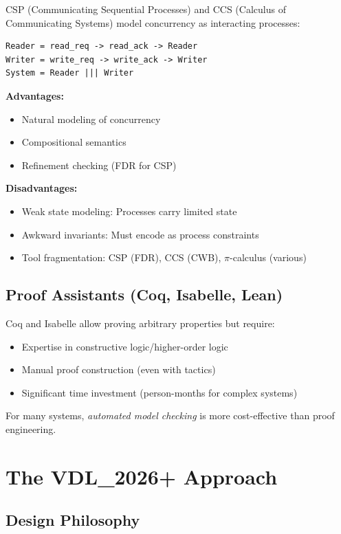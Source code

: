 \documentclass[conference]{IEEEtran}
\begin{document}
CSP (Communicating Sequential Processes) \cite{hoare1985} and CCS (Calculus of Communicating Systems) \cite{milner1989} model concurrency as interacting processes:

\begin{verbatim}
Reader = read_req -> read_ack -> Reader
Writer = write_req -> write_ack -> Writer
System = Reader ||| Writer
\end{verbatim}

\textbf{Advantages:}
\begin{itemize}
\item Natural modeling of concurrency
\item Compositional semantics
\item Refinement checking (FDR for CSP)
\end{itemize}

\textbf{Disadvantages:}
\begin{itemize}
\item Weak state modeling: Processes carry limited state
\item Awkward invariants: Must encode as process constraints
\item Tool fragmentation: CSP (FDR), CCS (CWB), $\pi$-calculus (various)
\end{itemize}

\subsection{Proof Assistants (Coq, Isabelle, Lean)}

Coq and Isabelle allow proving arbitrary properties but require:
\begin{itemize}
\item Expertise in constructive logic/higher-order logic
\item Manual proof construction (even with tactics)
\item Significant time investment (person-months for complex systems)
\end{itemize}

For many systems, \textit{automated model checking} is more cost-effective than proof engineering.

\section{The VDL\_2026+ Approach}
\label{sec:approach}

\subsection{Design Philosophy}
\end{document}
